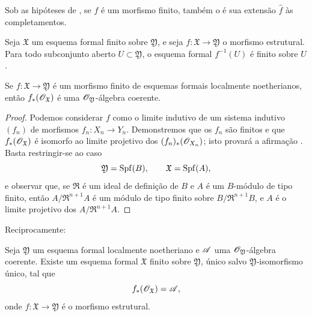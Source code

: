 \begin{corollary}[4.8.4]
\label{III.4.8.4}
Sob as hipóteses de , se $f$ é um morfismo
finito, também o é sua extensão $\widehat{f}$ às
completamentos.
\end{corollary}

\begin{corollary}[4.8.5]
\label{III.4.8.5}
Seja $\mathfrak{X}$ um esquema formal finito sobre
$\mathfrak{Y}$, e seja
$f:\mathfrak{X}\to\mathfrak{Y}$ o morfismo estrutural. Para
todo subconjunto aberto $U\subset\mathfrak{Y}$, o esquema formal
$f^{-1}(U)$ é finito sobre $U$.
\end{corollary}

\begin{proposition}[4.8.6]
\label{III.4.8.6}
Se $f:\mathfrak{X}\to\mathfrak{Y}$ é um morfismo finito de esquemas
formais localmente noetherianos, então
$f_*(\mathscr{O}_{\mathfrak{X}})$ é uma
$\mathscr{O}_{\mathfrak{Y}}$-álgebra coerente.
\end{proposition}

\begin{proof}
Podemos considerar $f$ como o limite indutivo de um sistema indutivo
$(f_n)$ de morfismos $f_n:X_n\to Y_n$. Demonstremos que os
$f_n$ são finitos e que $f_*(\mathscr{O}_{\mathfrak{X}})$ é
isomorfo ao limite projetivo dos
$(f_n)_*(\mathscr{O}_{X_n})$; isto provará a afirmação
. Basta restringir-se ao caso
\[
  \mathfrak{Y}=\operatorname{Spf}(B),\qquad \mathfrak{X}=\operatorname{Spf}(A),
\]
e observar que, se $\mathfrak{R}$ é um ideal de definição
de $B$ e $A$ é um $B$-módulo de tipo finito, então
$A/\mathfrak{R}^{n+1}A$ é um módulo de tipo finito sobre
$B/\mathfrak{R}^{n+1}B$, e $A$ é o limite projetivo dos
$A/\mathfrak{R}^{n+1}A$.
\end{proof}

Reciprocamente:

\begin{proposition}[4.8.7]
\label{III.4.8.7}
Seja $\mathfrak{Y}$ um esquema formal localmente noetheriano e
$\mathscr{A}$ uma $\mathscr{O}_{\mathfrak{Y}}$-álgebra coerente. Existe
um esquema formal $\mathfrak{X}$ finito sobre $\mathfrak{Y}$,
único salvo $\mathfrak{Y}$-isomorfismo único, tal que
\[
  f_*(\mathscr{O}_{\mathfrak{X}})=\mathscr{A},
\]
onde $f:\mathfrak{X}\to\mathfrak{Y}$ é o morfismo estrutural.
\end{proposition}

